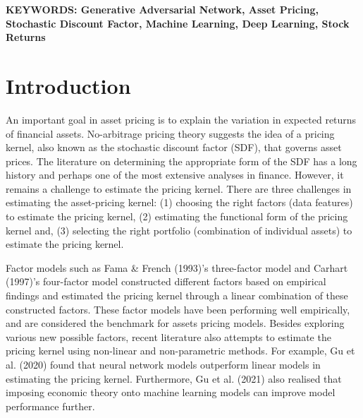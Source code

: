 \documentclass[12pt]{article}
\begin{document}
    \vfill

            \textbf{KEYWORDS: Generative Adversarial Network, Asset Pricing, Stochastic Discount Factor, Machine Learning, Deep Learning, Stock Returns}
    
    \vfill

\newpage

    \setcounter{tocdepth}{2}
    \tableofcontents

\listoffigures
{}
\listoftables
{}
\newpage

\fancyhf{}
\fancyhead[R]{\thepage}
\setlength{\headheight}{15pt}

\hypertarget{introduction}{%
\section{Introduction}\label{introduction}}

\thispagestyle{plain}

An important goal in asset pricing is to explain the variation
in expected returns of financial assets.
No-arbitrage pricing theory suggests the idea of a pricing
kernel, also known as the stochastic discount factor (SDF),
that governs asset prices.
The literature on determining the appropriate form of the
SDF has a long history and perhaps one of the most extensive
analyses in finance.
However, it remains a challenge to estimate the pricing
kernel. There are three challenges in estimating the
asset-pricing kernel:
(1) choosing the right factors (data features) to
estimate the pricing kernel,
(2) estimating the functional form of the pricing
kernel and,
(3) selecting the right portfolio (combination of
individual assets) to estimate the pricing kernel.

Factor models such as Fama \& French (1993)'s three-factor model
and Carhart (1997)'s four-factor model
constructed different factors based on empirical
findings and estimated the pricing kernel through a linear
combination of these constructed factors.
These factor models have been performing well empirically,
and are considered the benchmark for assets pricing models.
Besides exploring various new possible factors,
recent literature also attempts to estimate the pricing
kernel using non-linear and non-parametric methods.
For example, Gu et al. (2020) found that neural network models
outperform linear models in estimating the pricing kernel.
Furthermore, Gu et al. (2021) also realised that imposing
economic theory onto machine learning models can
improve model performance further.
\end{document}
